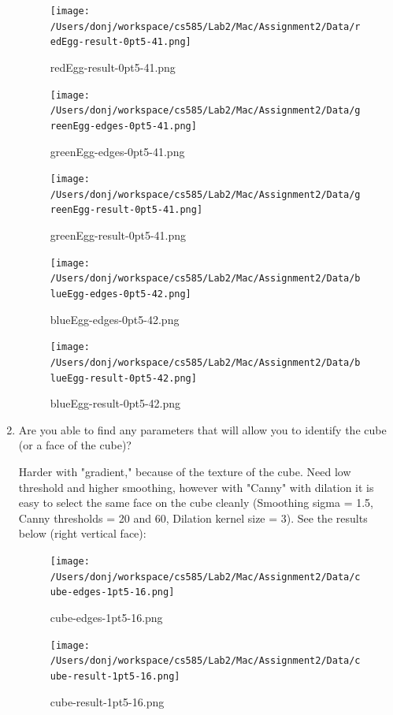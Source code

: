 \documentclass{article}
\begin{document}
\begin{enumerate}
\begin{figure}[H]
\centering
\texttt{[image: /Users/donj/workspace/cs585/Lab2/Mac/Assignment2/Data/redEgg-result-0pt5-41.png]}
\caption{redEgg-result-0pt5-41.png}
\label{overflow}
\end{figure}

\begin{figure}[H]
\centering
\texttt{[image: /Users/donj/workspace/cs585/Lab2/Mac/Assignment2/Data/greenEgg-edges-0pt5-41.png]}
\caption{greenEgg-edges-0pt5-41.png}
\label{overflow}
\end{figure}

\begin{figure}[H]
\centering
\texttt{[image: /Users/donj/workspace/cs585/Lab2/Mac/Assignment2/Data/greenEgg-result-0pt5-41.png]}
\caption{greenEgg-result-0pt5-41.png}
\label{overflow}
\end{figure}

\begin{figure}[H]
\centering
\texttt{[image: /Users/donj/workspace/cs585/Lab2/Mac/Assignment2/Data/blueEgg-edges-0pt5-42.png]}
\caption{blueEgg-edges-0pt5-42.png}
\label{overflow}
\end{figure}

\begin{figure}[H]
\centering
\texttt{[image: /Users/donj/workspace/cs585/Lab2/Mac/Assignment2/Data/blueEgg-result-0pt5-42.png]}
\caption{blueEgg-result-0pt5-42.png}
\label{overflow}
\end{figure}

\item
Are you able to find any parameters that will allow you to identify the cube (or a face of the cube)? 

Harder with "gradient," because of the texture of the cube. Need low threshold and higher smoothing, however with "Canny" with dilation it is easy to select the same face on the cube cleanly (Smoothing sigma = 1.5, Canny thresholds = 20 and 60, Dilation kernel size = 3). See the results below (right vertical face):

\begin{figure}[H]
\centering
\texttt{[image: /Users/donj/workspace/cs585/Lab2/Mac/Assignment2/Data/cube-edges-1pt5-16.png]}
\caption{cube-edges-1pt5-16.png}
\label{overflow}
\end{figure}

\begin{figure}[H]
\centering
\texttt{[image: /Users/donj/workspace/cs585/Lab2/Mac/Assignment2/Data/cube-result-1pt5-16.png]}
\caption{cube-result-1pt5-16.png}
\label{overflow}
\end{figure}


\end{enumerate}
\end{document}

